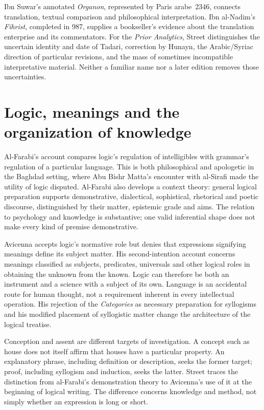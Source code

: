 Ibn Suwar's annotated \emph{Organon}, represented by Paris
arabe~2346, connects translation, textual comparison and
philosophical interpretation. Ibn al-Nadim's \emph{Fihrist},
completed in 987, supplies a bookseller's evidence about the
translation enterprise and its commentators. For the \emph{Prior
Analytics}, Street distinguishes the uncertain identity and date
of Tadari, correction by Hunayn, the Arabic/Syriac direction
of particular revisions, and the mass of sometimes incompatible
interpretative material. Neither a familiar name nor a later
edition removes those uncertainties.
\cite[pp.~532--533]{Street2004ArabicLogicHHL}

\section{Logic, meanings and the organization of knowledge}
\label{sec:p13-street-2004-language-knowledge}

Al-Farabi's account compares logic's regulation of intelligibles
with grammar's regulation of a particular language. This is
both philosophical and apologetic in the Baghdad setting,
where Abu Bishr Matta's encounter with al-Sirafi made the
utility of logic disputed. Al-Farabi also develops a context
theory: general logical preparation supports demonstrative,
dialectical, sophistical, rhetorical and poetic discourse,
distinguished by their matter, epistemic grade and aims.
The relation to psychology and knowledge is substantive;
one valid inferential shape does not make every kind of
premise demonstrative.
\cite[pp.~536--539]{Street2004ArabicLogicHHL}

Avicenna accepts logic's normative role but denies that
expressions signifying meanings define its subject matter.
His second-intention account concerns meanings classified
as subjects, predicates, universals and other logical roles
in obtaining the unknown from the known. Logic can therefore
be both an instrument and a science with a subject of its
own. Language is an accidental route for human thought,
not a requirement inherent in every intellectual operation.
His rejection of the \emph{Categories} as necessary preparation
for syllogisms and his modified placement of syllogistic
matter change the architecture of the logical treatise.
\cite[pp.~539--541]{Street2004ArabicLogicHHL}

Conception and assent are different targets of investigation.
A concept such as house does not itself affirm that houses
have a particular property. An explanatory phrase, including
definition or description, seeks the former target; proof,
including syllogism and induction, seeks the latter. Street
traces the distinction from al-Farabi's demonstration theory
to Avicenna's use of it at the beginning of logical writing.
The difference concerns knowledge and method, not simply
whether an expression is long or short.
\cite[pp.~540--542]{Street2004ArabicLogicHHL}

